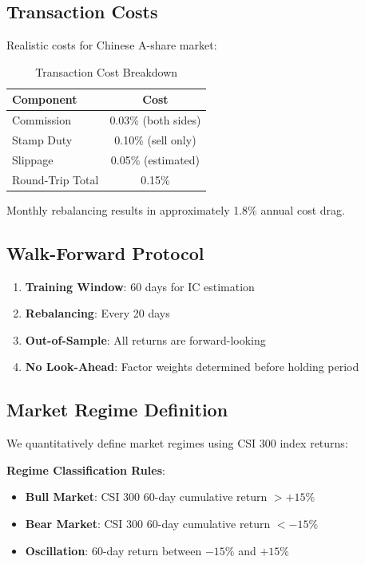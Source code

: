 \subsection{Transaction Costs}

Realistic costs for Chinese A-share market:

\begin{table}[h]
\centering
\caption{Transaction Cost Breakdown}
\begin{tabular}{lc}
\toprule
Component & Cost \\
\midrule
Commission & 0.03\% (both sides) \\
Stamp Duty & 0.10\% (sell only) \\
Slippage & 0.05\% (estimated) \\
\midrule
Round-Trip Total & 0.15\% \\
\bottomrule
\end{tabular}
\end{table}

Monthly rebalancing results in approximately 1.8\% annual cost drag.

\subsection{Walk-Forward Protocol}

\begin{enumerate}
    \item \textbf{Training Window}: 60 days for IC estimation
    \item \textbf{Rebalancing}: Every 20 days
    \item \textbf{Out-of-Sample}: All returns are forward-looking
    \item \textbf{No Look-Ahead}: Factor weights determined before holding period
\end{enumerate}

\subsection{Market Regime Definition}

We quantitatively define market regimes using CSI 300 index returns:

\textbf{Regime Classification Rules}:
\begin{itemize}
    \item \textbf{Bull Market}: CSI 300 60-day cumulative return $> +15\%$
    \item \textbf{Bear Market}: CSI 300 60-day cumulative return $< -15\%$
    \item \textbf{Oscillation}: 60-day return between $-15\%$ and $+15\%$
\end{itemize}


